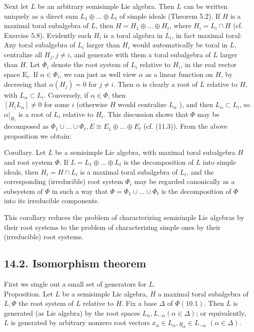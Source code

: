 \documentclass[10pt]{article}
\begin{document}
Next let $L$ be an arbitrary semisimple Lie algebra. Then $L$ can be written uniquely as a direct sum $L_{1} \oplus \ldots \oplus L_{t}$ of simple ideals (Theorem 5.2). If $H$ is a maximal toral subalgebra of $L$, then $H=H_{1} \oplus \ldots \oplus H_{t}$, where $H_{i}=L_{i} \cap H$ (cf. Exercise 5.8). Evidently each $H_{i}$ is a toral algebra in $L_{i}$, in fact maximal toral: Any toral subalgebra of $L_{i}$ larger than $H_{i}$ would automatically be toral in $L$, centralize all $H_{j}, j \neq i$, and generate with them a toral subalgebra of $L$ larger than $H$. Let $\Phi_{i}$ denote the root system of $L_{i}$ relative to $H_{i}$, in the real vector space $\mathrm{E}_{i}$. If $\alpha \in \Phi_{i}$, we can just as well view $\alpha$ as a linear function on $H$, by decreeing that $\alpha\left(H_{j}\right)=0$ for $j \neq i$. Then $\alpha$ is clearly a root of $L$ relative to $H$, with $L_{\alpha} \subset L_{i}$. Conversely, if $\alpha \in \Phi$, then\\
$\left[H_{i} L_{\alpha}\right] \neq 0$ for some $i$ (otherwise $H$ would centralize $L_{\alpha}$ ), and then $L_{\alpha} \subset L_{i}$, so $\left.\alpha\right|_{H_{i}}$ is a root of $L_{i}$ relative to $H_{i}$. This discussion shows that $\Phi$ may be decomposed as $\Phi_{1} \cup \ldots \cup \Phi_{t}, E \cong E_{1} \oplus \ldots \oplus E_{t}$ (cf. (11.3)). From the above proposition we obtain:

Corollary. Let $L$ be a semisimple Lie algebra, with maximal toral subalgebra $H$ and root system $\Phi$. If $L=L_{1} \oplus \ldots \oplus L_{t}$ is the decomposition of $L$ into simple ideals, then $H_{i}=H \cap L_{i}$ is a maximal toral subalgebra of $L_{i}$, and the corresponding (irreducible) root system $\Phi_{i}$ may be regarded canonically as a subsystem of $\Phi$ in such a way that $\Phi=\Phi_{1} \cup \ldots \cup \Phi_{t}$ is the decomposition of $\Phi$ into its irreducible components.

This corollary reduces the problem of characterizing semisimple Lie algebras by their root systems to the problem of characterizing simple ones by their (irreducible) root systems.

\subsection*{14.2. Isomorphism theorem}
First we single out a small set of generators for $L$.\\
Proposition. Let $L$ be a semisimple Lie algebra, $H$ a maximal toral subalgebra of $L, \Phi$ the root system of $L$ relative to $H$. Fix a base $\Delta$ of $\Phi(10.1)$. Then $L$ is generated (as Lie algebra) by the root spaces $L_{\alpha}, L_{-\alpha}(\alpha \in \Delta)$; or equivalently, $L$ is generated by arbitrary nonzero root vectors $x_{\alpha} \in L_{\alpha}, y_{\alpha} \in L_{-\alpha}$ $(\alpha \in \Delta)$.
\end{document}
